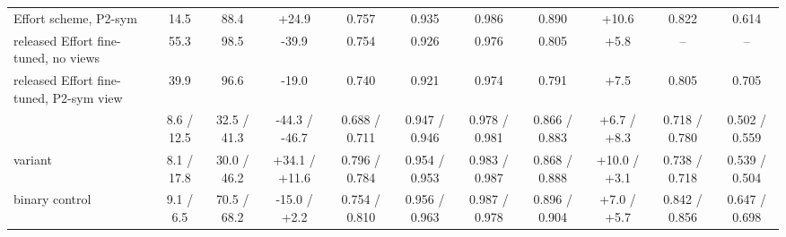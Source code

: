 \begin{tabular}{@{}l cc cc cc cc cc@{}}
Effort scheme, P2-sym & 14.5 & 88.4 & +24.9 & 0.757 & 0.935 & 0.986 & 0.890 & +10.6 & 0.822 & 0.614 \\
released Effort fine-tuned, no views & 55.3 & 98.5 & -39.9 & 0.754 & 0.926 & 0.976 & 0.805 & +5.8 & -- & -- \\
released Effort fine-tuned, P2-sym view & 39.9 & 96.6 & -19.0 & 0.740 & 0.921 & 0.974 & 0.791 & +7.5 & 0.805 & 0.705 \\
\ours{} & 8.6 / 12.5 & 32.5 / 41.3 & -44.3 / -46.7 & 0.688 / 0.711 & 0.947 / 0.946 & 0.978 / 0.981 & 0.866 / 0.883 & +6.7 / +8.3 & 0.718 / 0.780 & 0.502 / 0.559 \\
\ours{} variant & 8.1 / 17.8 & 30.0 / 46.2 & +34.1 / +11.6 & 0.796 / 0.784 & 0.954 / 0.953 & 0.983 / 0.987 & 0.868 / 0.888 & +10.0 / +3.1 & 0.738 / 0.718 & 0.539 / 0.504 \\
binary control & 9.1 / 6.5 & 70.5 / 68.2 & -15.0 / +2.2 & 0.754 / 0.810 & 0.956 / 0.963 & 0.987 / 0.978 & 0.896 / 0.904 & +7.0 / +5.7 & 0.842 / 0.856 & 0.647 / 0.698 \\
\bottomrule
\end{tabular}
